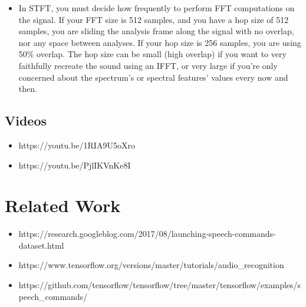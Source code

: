 \documentclass[letterpaper,10pt,english]{sphinxmanual}
\begin{document}
\begin{itemize}
\item {} 
In STFT, you must decide how frequently to perform FFT computations on the
signal. If your FFT size is 512 samples, and you have a hop size of 512 samples, you are
sliding the analysis frame along the signal with no overlap, nor any space between
analyses. If your hop size is 256 samples, you are using 50\% overlap. The hop size can be
small (high overlap) if you want to very faithfully recreate the sound using an IFFT, or
very large if you’re only concerned about the spectrum’s or spectral features’ values
every now and then.

\end{itemize}


\section{Videos}
\label{\detokenize{AudioBasics:videos}}\label{\detokenize{AudioBasics:videos}}\begin{itemize}
\item {} 
https://youtu.be/1RIA9U5oXro

\item {} 
https://youtu.be/PjlIKVnKe8I

\end{itemize}


\chapter{Related Work}
\label{\detokenize{References:related-work}}\label{\detokenize{References:related-work}}\label{\detokenize{References::doc}}\begin{itemize}
\item {} 
https://research.googleblog.com/2017/08/launching-speech-commands-dataset.html

\item {} 
https://www.tensorflow.org/versions/master/tutorials/audio\_recognition

\item {} 
https://github.com/tensorflow/tensorflow/tree/master/tensorflow/examples/speech\_commands/

\end{itemize}
\end{document}
